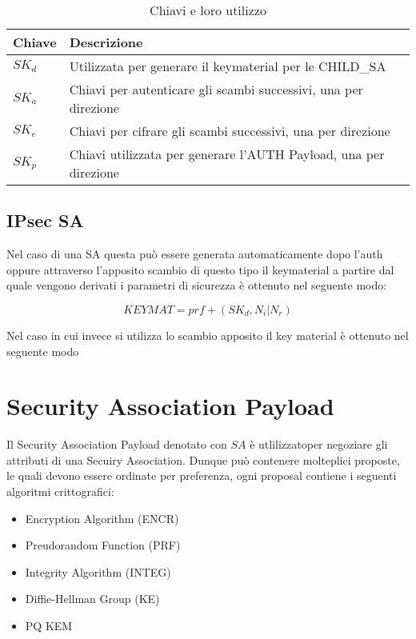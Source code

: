 \begin{table}[htbp]
    \centering
    \begin{tabular}{ll}
        \toprule
        \textbf{Chiave} & \textbf{Descrizione} \\
        \midrule
        $SK_d$ & Utilizzata per generare il keymaterial per le CHILD\_SA \\
        $SK_{a}$ & Chiavi per autenticare gli scambi successivi, una per direzione \\
        $SK_{e}$ & Chiavi per cifrare gli scambi successivi, una per direzione \\
        $SK_{p}$ & Chiavi utilizzata per generare l'AUTH Payload, una per direzione \\
        \bottomrule
    \end{tabular}
    \caption{Chiavi e loro utilizzo}
\end{table}

\subsection{IPsec SA}

Nel caso di una SA questa può essere generata automaticamente dopo l'auth oppure attraverso l'apposito scambio di questo tipo il keymaterial a partire dal quale vengono derivati i parametri di sicurezza è ottenuto nel seguente modo:

$$KEYMAT=prf+(SK_d,  N_i|N_r)$$

Nel caso in cui invece si utilizza lo scambio apposito il key material è ottenuto nel seguente modo


\section{Security Association Payload}

Il Security Association Payload denotato con $SA$ è utlilizzatoper negoziare gli attributi di una Secuiry Association. 
Dunque può contenere molteplici proposte, le quali devono essere ordinate per preferenza, ogni proposal contiene i seguenti algoritmi crittografici:

\begin{itemize}
    \item Encryption Algorithm (ENCR)
    \item Preudorandom Function (PRF)
    \item Integrity Algorithm (INTEG)
    \item Diffie-Hellman Group (KE)
    \item PQ KEM 
\end{itemize}



